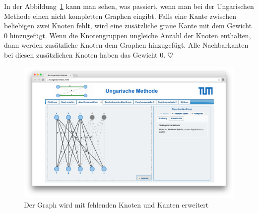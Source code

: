 In der Abbildung~\ref{fig:hungarian-complete} kann man sehen, was passiert, wenn man bei der Ungarischen Methode einen nicht kompletten Graphen eingibt. Falls eine Kante zwischen beliebigen zwei Knoten fehlt, wird eine zusätzliche graue Kante mit dem Gewicht 0 hinzugefügt. Wenn die Knotengruppen ungleiche Anzahl der Knoten enthalten, dann werden zusätzliche Knoten dem Graphen hinzugefügt. Alle Nachbarkanten bei diesen zusätzlichen Knoten haben das Gewicht 0. \hfill$\heartsuit$
\begin{figure}[h!]
	\centering
	\includegraphics[width=\textwidth]{figures/hungarian-complete}
	\caption[Vollständiger, bipartiter Graph]{Der Graph wird mit fehlenden Knoten und Kanten erweitert}\label{fig:hungarian-complete}
\end{figure}

